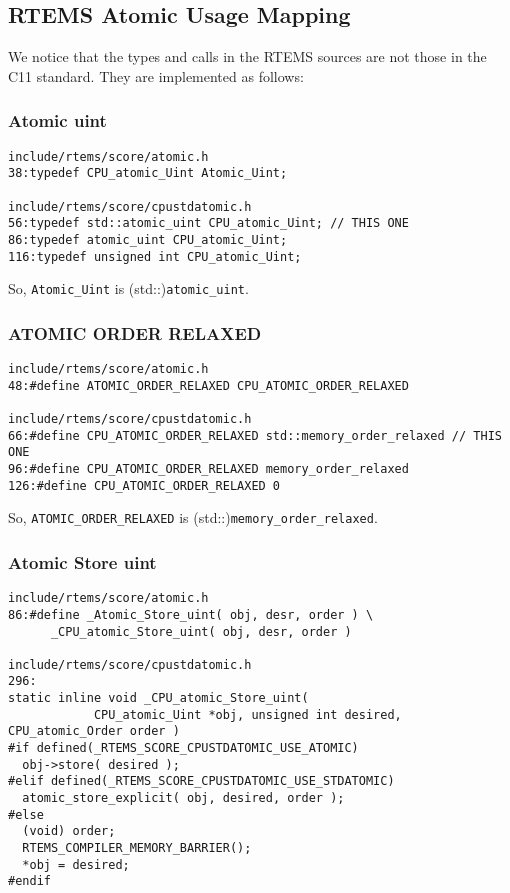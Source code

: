 \newpage
\subsection{RTEMS Atomic Usage Mapping}

We notice that the types and calls in the RTEMS sources
are not those in the C11 standard.
They are implemented as follows:

\subsubsection{Atomic uint}

\begin{verbatim}
include/rtems/score/atomic.h
38:typedef CPU_atomic_Uint Atomic_Uint;

include/rtems/score/cpustdatomic.h
56:typedef std::atomic_uint CPU_atomic_Uint; // THIS ONE
86:typedef atomic_uint CPU_atomic_Uint;
116:typedef unsigned int CPU_atomic_Uint;
\end{verbatim}

So, \verb"Atomic_Uint"  is (std::)\verb"atomic_uint".

\subsubsection{ATOMIC ORDER RELAXED}

\begin{verbatim}
include/rtems/score/atomic.h
48:#define ATOMIC_ORDER_RELAXED CPU_ATOMIC_ORDER_RELAXED

include/rtems/score/cpustdatomic.h
66:#define CPU_ATOMIC_ORDER_RELAXED std::memory_order_relaxed // THIS ONE
96:#define CPU_ATOMIC_ORDER_RELAXED memory_order_relaxed
126:#define CPU_ATOMIC_ORDER_RELAXED 0
\end{verbatim}

So, \verb"ATOMIC_ORDER_RELAXED"  is (std::)\verb"memory_order_relaxed".

\subsubsection{Atomic Store uint}

\begin{verbatim}
include/rtems/score/atomic.h
86:#define _Atomic_Store_uint( obj, desr, order ) \
      _CPU_atomic_Store_uint( obj, desr, order )

include/rtems/score/cpustdatomic.h
296:
static inline void _CPU_atomic_Store_uint(
            CPU_atomic_Uint *obj, unsigned int desired, CPU_atomic_Order order )
#if defined(_RTEMS_SCORE_CPUSTDATOMIC_USE_ATOMIC)
  obj->store( desired );
#elif defined(_RTEMS_SCORE_CPUSTDATOMIC_USE_STDATOMIC)
  atomic_store_explicit( obj, desired, order );
#else
  (void) order;
  RTEMS_COMPILER_MEMORY_BARRIER();
  *obj = desired;
#endif
\end{verbatim}

